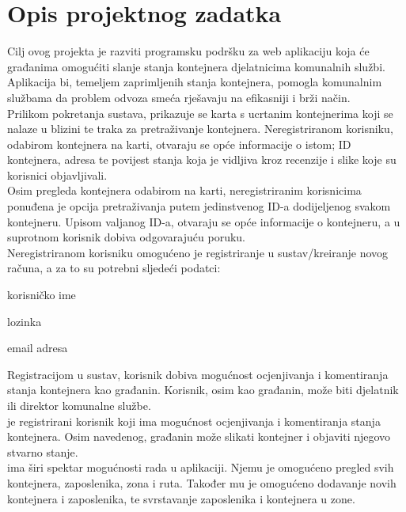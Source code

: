 \chapter{Opis projektnog zadatka}

		Cilj ovog projekta je razviti programsku podršku za web aplikaciju koja će građanima omogućiti slanje stanja kontejnera djelatnicima komunalnih službi. Aplikacija bi, temeljem zaprimljenih stanja kontejnera, pomogla komunalnim službama da problem odvoza smeća rješavaju na efikasniji i brži način.\\
		
		Prilikom pokretanja sustava, prikazuje se karta s ucrtanim kontejnerima koji se nalaze u blizini te traka za pretraživanje kontejnera.
        Neregistriranom korisniku, odabirom kontejnera na karti, otvaraju se opće informacije o istom; ID kontejnera, adresa te povijest stanja
        koja je vidljiva kroz recenzije i slike koje su korisnici objavljivali.\\

        Osim pregleda kontejnera odabirom na karti, neregistriranim korisnicima ponuđena je opcija pretraživanja
        putem jedinstvenog ID-a dodijeljenog svakom kontejneru. Upisom valjanog ID-a, otvaraju se opće informacije o kontejneru, a u suprotnom korisnik dobiva odgovarajuću
        poruku.\\
        
        Neregistriranom korisniku omogućeno je registriranje u sustav/kreiranje novog računa, a
        za to su potrebni sljedeći podatci:
        \begin{packed_item}
			
			\item  korisničko ime
			\item  lozinka
			\item  email adresa
			
		\end{packed_item}
		
		Registracijom u sustav, korisnik dobiva mogućnost ocjenjivanja i komentiranja stanja kontejnera kao građanin. Korisnik, osim kao građanin, može biti djelatnik ili direktor komunalne službe.\\
		
		 je registrirani korisnik koji ima mogućnost ocjenjivanja i komentiranja stanja kontejnera. Osim navedenog, građanin može slikati kontejner i objaviti njegovo stvarno stanje.\\
		
		 ima širi spektar mogućnosti rada u aplikaciji. Njemu je omogućeno pregled svih kontejnera, zaposlenika, zona i ruta. Također mu je omogućeno dodavanje novih kontejnera i zaposlenika, te svrstavanje zaposlenika i kontejnera u zone.\\
		
		
		\eject
	